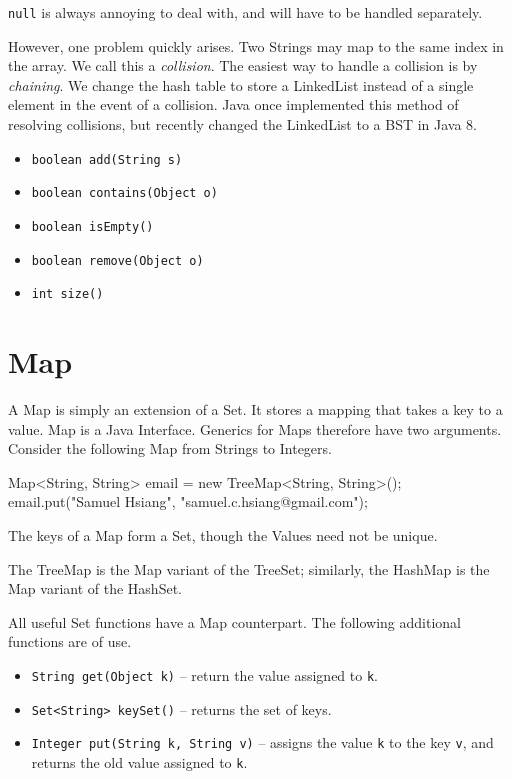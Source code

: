 \documentclass[11pt]{book}
\begin{document}
\texttt{null} is always annoying to deal with, and will have to be handled separately.

However, one problem quickly arises. Two Strings may map to the same index in the array. We call this a \textit{collision}. The easiest way to handle a collision is by \textit{chaining}. We change the hash table to store a LinkedList instead of a single element in the event of a collision. Java once implemented this method of resolving collisions, but recently changed the LinkedList to a BST in Java 8.

\begin{itemize}

\item
\texttt{boolean add(String s)}

\item
\texttt{boolean contains(Object o)}

\item
\texttt{boolean isEmpty()}

\item
\texttt{boolean remove(Object o)}

\item
\texttt{int size()}

\end{itemize}

\section{Map}

A Map is simply an extension of a Set. It stores a mapping that takes a key to a value. Map is a Java Interface. Generics for Maps therefore have two arguments. Consider the following Map from Strings to Integers.

\begin{mylstlisting}
Map<String, String> email = new TreeMap<String, String>();
email.put("Samuel Hsiang", "samuel.c.hsiang@gmail.com");
\end{mylstlisting}

The keys of a Map form a Set, though the Values need not be unique.

The TreeMap is the Map variant of the TreeSet; similarly, the HashMap is the Map variant of the HashSet.

All useful Set functions have a Map counterpart. The following additional functions are of use.

\begin{itemize}

\item
\texttt{String get(Object k)} -- return the value assigned to \texttt{k}.

\item
\texttt{Set<String> keySet()} -- returns the set of keys.

\item
\texttt{Integer put(String k, String v)} -- assigns the value \texttt{k} to the key \texttt{v}, and returns the old value assigned to \texttt{k}.

\end{itemize}
\end{document}
